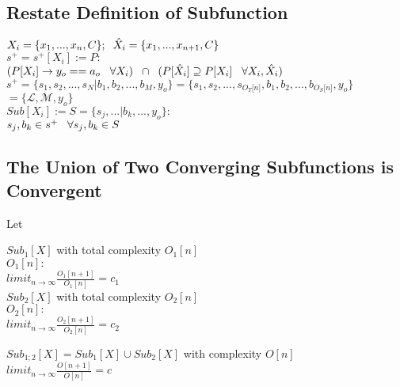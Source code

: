 \documentclass[11pt]{article}
\begin{document}
\subsection{Restate Definition of Subfunction}
\begin{center}
$
X_i = \{x_1,...,x_n,C\}; \hspace{2mm} \hat{X}_i = \{x_1,...,x_{n+1},C\}
$
\\ \vspace{2mm}
$
s^+ = s^+[X_i] := P :
$
\\ \vspace{2mm}
$
(P \lbrack X_i \rbrack \rightarrow y_{o} == a_{o} \hspace{3mm} \forall X_i) \hspace{2mm} \cap \hspace{2mm} (P[\hat{X}_i] \supseteq P[X_i] \hspace{3mm} \forall X_i,\hat{X}_i)
$
\\ \vspace{4mm}
$
s^+ = \{ s_1,s_2,...,s_N|b_1,b_2,...,b_M,y_o\} = \{ s_1,s_2,...,s_{O_T \lbrack n \rbrack }, b_1, b_2,...,b_{O_S \lbrack n \rbrack},y_o \}
$
\\ \vspace{2mm}
$
= \{ \mathcal{L},\mathcal{M},y_o\}
$
\\ \vspace{6mm}
$
Sub[X_i] := S = \{s_j,...|b_k,...,y_o\}:
$
\\ \vspace{2mm}
$
s_j,b_k \in s^+ \hspace{3mm} \forall s_j,b_k \in S
$
\end{center}





\subsection{The Union of Two Converging Subfunctions is Convergent}
Let
\begin{center}
$
Sub_1[X]$ with total complexity $O_1[n]$
\\ \vspace{2mm}
$
O_1[n]:
$
\\ \vspace{2mm}
$
limit_{n \rightarrow \infty}\frac{O_1[n+1]}{O_1[n]} = c_1
$
\\ \vspace{6mm}
$
Sub_2[X]$ with total complexity $O_2[n]$
\\ \vspace{2mm}
$
O_2[n]:
$
\\ \vspace{2mm}
$
limit_{n \rightarrow \infty}\frac{O_2[n+1]}{O_2[n]} = c_2
$
\end{center}
\vspace{1mm}
\begin{center}
$
Sub_{1;2}[X] = Sub_1[X] \cup Sub_2[X]$ with complexity $O[n]
$
\\ \vspace{2mm}
$
limit_{n \rightarrow \infty}\frac{O[n+1]}{O[n]} = c
$
\end{center}
\end{document}
